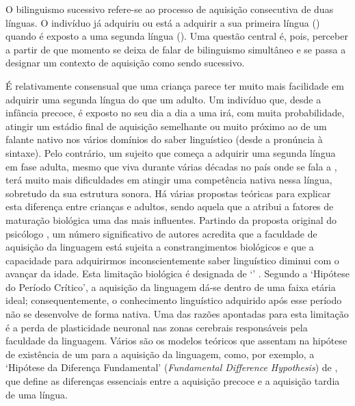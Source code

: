 \documentclass[output=paper]{LSP/langsci}
\begin{document}
O bilinguismo sucessivo refere-se ao processo de aquisição consecutiva de duas línguas. O indivíduo já adquiriu ou está a adquirir a sua primeira língua () quando é exposto a uma segunda língua (). Uma questão central é, pois, perceber a partir de que momento se deixa de falar de bilinguismo simultâneo e se passa a designar um contexto de aquisição como sendo sucessivo. 

É relativamente consensual que uma criança parece ter muito mais facilidade em adquirir uma segunda língua do que um adulto. Um indivíduo que, desde a infância precoce, é exposto no seu dia a dia a uma  irá, com muita probabilidade, atingir um estádio final de aquisição semelhante ou muito próximo ao de um falante nativo nos vários domínios do saber linguístico (desde a pronúncia à sintaxe). Pelo contrário, um sujeito que começa a adquirir uma segunda língua em fase adulta, mesmo que viva durante várias décadas no país onde se fala a , terá muito mais dificuldades em atingir uma competência nativa nessa língua, sobretudo da sua estrutura sonora. Há várias propostas teóricas para explicar esta diferença entre crianças e adultos, sendo aquela que a atribui a fatores de maturação biológica uma das mais influentes. Partindo da proposta original do psicólogo \cite{lenneberg1967}, um número significativo de autores acredita que a faculdade de aquisição da linguagem está sujeita a constrangimentos biológicos e que a capacidade para adquirirmos inconscientemente saber linguístico diminui com o avançar da idade. Esta limitação biológica é designada de `' \citep{lenneberg1967}. Segundo a `Hipótese do Período Crítico', a aquisição da linguagem dá-se dentro de uma faixa etária ideal; consequentemente, o conhecimento linguístico adquirido após esse período não se desenvolve de forma nativa. Uma das razões apontadas para esta limitação é a perda de plasticidade neuronal nas zonas cerebrais responsáveis pela faculdade da linguagem. Vários são os modelos teóricos que assentam na hipótese de existência de um  para a aquisição da linguagem, como, por exemplo, a `Hipótese da Diferença Fundamental' (\textit{Fundamental Difference Hypothesis}) de \cite{bley-vroman1990}, que define as diferenças essenciais entre a aquisição precoce e a aquisição tardia de uma língua. 
\end{document}
